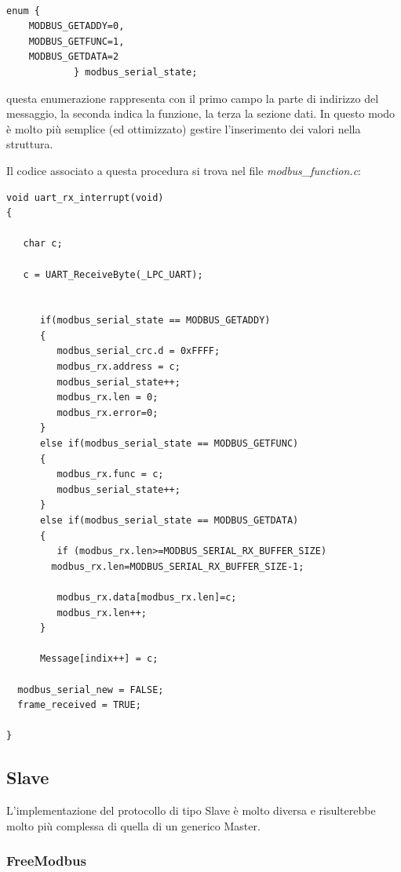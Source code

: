 \documentclass[a4paper,titlepage]{book}
\begin{document}
\begin{lstlisting}[showlines=false]

enum {
	MODBUS_GETADDY=0, 
	MODBUS_GETFUNC=1, 
	MODBUS_GETDATA=2 
			} modbus_serial_state;

\end{lstlisting}

questa enumerazione rappresenta con il primo campo la parte di indirizzo del messaggio, la seconda indica la funzione, la terza la sezione dati. In questo modo è molto più semplice (ed ottimizzato) gestire l'inserimento dei valori nella struttura.

Il codice associato a questa procedura si trova nel file \textit{modbus\_function.c}:

\begin{lstlisting}[showlines=true, firstnumber=202]
void uart_rx_interrupt(void)
{

   char c;

   c = UART_ReceiveByte(_LPC_UART);


      if(modbus_serial_state == MODBUS_GETADDY)
      {
         modbus_serial_crc.d = 0xFFFF;
         modbus_rx.address = c;
         modbus_serial_state++;
         modbus_rx.len = 0;
         modbus_rx.error=0;
      }
      else if(modbus_serial_state == MODBUS_GETFUNC)
      {
         modbus_rx.func = c;
         modbus_serial_state++;
      }
      else if(modbus_serial_state == MODBUS_GETDATA)
      {
         if (modbus_rx.len>=MODBUS_SERIAL_RX_BUFFER_SIZE) 
		modbus_rx.len=MODBUS_SERIAL_RX_BUFFER_SIZE-1;

         modbus_rx.data[modbus_rx.len]=c;
         modbus_rx.len++;
      }

      Message[indix++] = c;

  modbus_serial_new = FALSE;
  frame_received = TRUE;

}
\end{lstlisting}

\subsection{Slave}


L'implementazione del protocollo di tipo Slave è molto diversa e risulterebbe molto più complessa di quella di un generico Master.

\subsubsection{FreeModbus}
\end{document}
